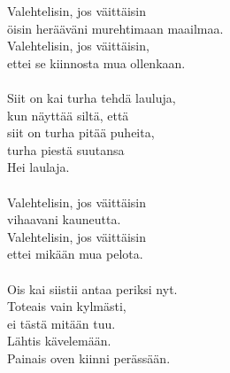 
        Valehtelisin, jos väittäisin \\
        öisin herääväni murehtimaan maailmaa. \\
        Valehtelisin, jos väittäisin, \\
        ettei se kiinnosta mua ollenkaan. \\
\hspace{10mm} \\
        Siit on kai turha tehdä lauluja, \\
        kun näyttää siltä, että \\
        siit on turha pitää puheita, \\
        turha piestä suutansa \\
        Hei laulaja. \\
\hspace{10mm} \\
        Valehtelisin, jos väittäisin \\
        vihaavani kauneutta. \\
        Valehtelisin, jos väittäisin \\
        ettei mikään mua pelota. \\
\hspace{10mm} \\
        Ois kai siistii antaa periksi nyt. \\
        Toteais vain kylmästi, \\
        ei tästä mitään tuu. \\
        Lähtis kävelemään. \\
        Painais oven kiinni perässään. \\
